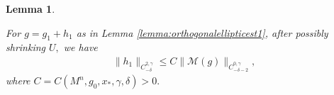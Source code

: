 \documentclass[12pt]{amsart}
\newcommand{\calM}{\mathcal{M}}
\renewcommand{\1}{{\mathbf 1}}
\newcommand{\eps}{{\varepsilon}}
\newtheorem{lemma}[thm]{Lemma}
\theoremstyle{others}
\numberwithin{equation}{section}
\begin{document}
\begin{lemma}\label{lemma:orthogMest}

    For $g = g_1 + h_1$ as in Lemma \ref{lemma:orthogonalellipticest1}, after possibly shrinking $U,$ we have
    \begin{gather}
    \label{hsmallness}
        \|h_1\|_{C^{2,\gamma}_{-\delta}} \leq C \| \calM(g) \|_{C^{0, \gamma}_{-\delta - 2}},
    \end{gather}
    where $C = C(M^n, g_0, x_*, \gamma, \delta) > 0.$



\end{lemma}
\end{document}
